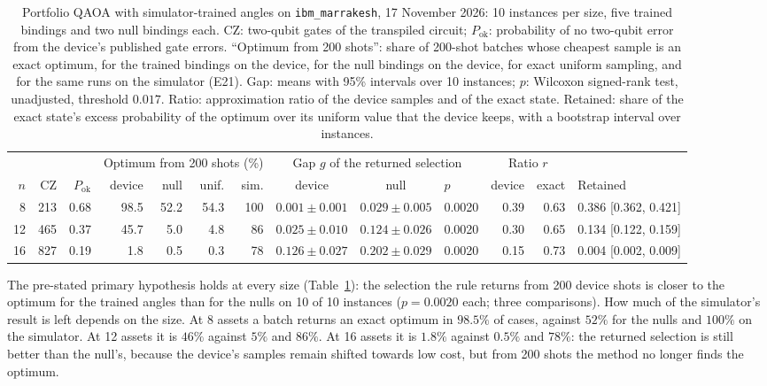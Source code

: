 \documentclass[11pt,a4paper]{article}
\begin{document}
\begin{table}[H]
\centering\footnotesize\setlength{\tabcolsep}{1.8pt}
\begin{tabular}{rrrrrrrcclrrl}
\toprule
 & & & \multicolumn{4}{c}{Optimum from 200 shots (\%)} & \multicolumn{3}{c}{Gap $g$ of the returned selection} & \multicolumn{2}{c}{Ratio $r$} & \\
$n$ & CZ & $P_{\mathrm{ok}}$ & device & null & unif. & sim. & device & null & $p$ & device & exact & Retained \\
\midrule
8 & 213 & 0.68 & 98.5 & 52.2 & 54.3 & 100 & $0.001 \pm 0.001$ & $0.029 \pm 0.005$ & 0.0020 & 0.39 & 0.63 & 0.386 [0.362, 0.421] \\
12 & 465 & 0.37 & 45.7 & 5.0 & 4.8 & 86 & $0.025 \pm 0.010$ & $0.124 \pm 0.026$ & 0.0020 & 0.30 & 0.65 & 0.134 [0.122, 0.159] \\
16 & 827 & 0.19 & 1.8 & 0.5 & 0.3 & 78 & $0.126 \pm 0.027$ & $0.202 \pm 0.029$ & 0.0020 & 0.15 & 0.73 & 0.004 [0.002, 0.009] \\
\bottomrule
\end{tabular}
\caption{Portfolio QAOA with simulator-trained angles on
\texttt{ibm\_marrakesh}, 17 November 2026: 10 instances per size, five
trained bindings and two null bindings each. CZ: two-qubit gates of the
transpiled circuit; $P_{\mathrm{ok}}$: probability of no two-qubit error
from the device's published gate errors. ``Optimum from 200 shots'': share
of 200-shot batches whose cheapest sample is an exact optimum, for the
trained bindings on the device, for the null bindings on the device, for
exact uniform sampling, and for the same runs on the simulator (E21). Gap:
means with 95\% intervals over 10 instances; $p$: Wilcoxon signed-rank test,
unadjusted, threshold $0.017$. Ratio: approximation ratio of the device
samples and of the exact state. Retained: share of the exact state's excess
probability of the optimum over its uniform value that the device keeps,
with a bootstrap interval over instances.}
\label{tab:hw-portfolio}
\end{table}

The pre-stated primary hypothesis holds at every size
(Table~\ref{tab:hw-portfolio}): the selection the rule returns from 200
device shots is closer to the optimum for the trained angles than for the
nulls on 10 of 10 instances ($p = 0.0020$ each; three comparisons). How much
of the simulator's result is left depends on the size. At 8 assets a batch
returns an exact optimum in $98.5\%$ of cases, against $52\%$ for the nulls
and $100\%$ on the simulator. At 12 assets it is $46\%$ against $5\%$ and
$86\%$. At 16 assets it is $1.8\%$ against $0.5\%$ and $78\%$: the returned
selection is still better than the null's, because the device's samples
remain shifted towards low cost, but from 200 shots the method no longer
finds the optimum.
\end{document}

